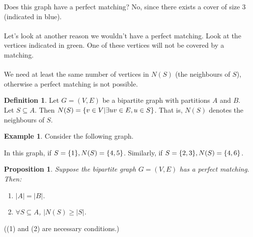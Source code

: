 \documentclass[]{article}
\newtheorem*{proposition}{Proposition}
\theoremstyle{definition}
\newtheorem*{defn}{Definition}
\newtheorem{ex}{Example}[section]
\DeclarePairedDelimiter{\set}{\lbrace}{\rbrace}
\begin{document}
			Does this graph have a perfect matching? No, since there exists a cover of size 3 (indicated in blue).
			\\ \\
			Let's look at another reason we wouldn't have a perfect matching. Look at the vertices indicated in green. One of these vertices will not be covered by a matching.
			\\ \\
			We need at least the same number of vertices in $N(S)$ (the neighbours of $S$), otherwise a perfect matching is not possible.
			
			\begin{defn}
				Let $G = (V, E)$ be a bipartite graph with partitions $A$ and $B$. Let $S \subseteq A$. Then $N(S) = \set{v \in V | \exists uv \in E, u \in S}$. That is, $N(S)$ denotes the neighbours of $S$.
			\end{defn}
			
			\begin{ex}
				Consider the following graph.
				\begin{center}
				\end{center}
				
				In this graph, if $S = \set{1}, N(S) = \set{4, 5}$. Similarly, if $S = \set{2, 3}, N(S) = \set{4, 6}$.
			\end{ex}
			
			\begin{proposition}
				Suppose the bipartite graph $G = (V, E)$ has a perfect matching. Then:
				\begin{enumerate}
					\item $|A| = |B|$.
					\item $\forall S \subseteq A$, $|N(S) \ge |S|$.
				\end{enumerate}
			\end{proposition}
			
			((1) and (2) are necessary conditions.)
			
\end{document}
